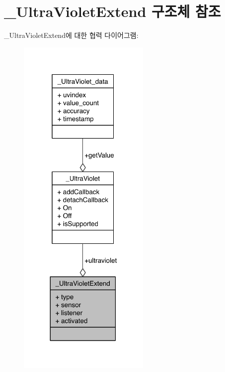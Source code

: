 \hypertarget{struct__UltraVioletExtend}{\section{\-\_\-\-Ultra\-Violet\-Extend 구조체 참조}
\label{struct__UltraVioletExtend}
}


\-\_\-\-Ultra\-Violet\-Extend에 대한 협력 다이어그램\-:\nopagebreak
\begin{figure}[H]
\begin{center}
\leavevmode
\includegraphics[width=180pt]{d5/d80/struct__UltraVioletExtend__coll__graph}
\end{center}
\end{figure}
